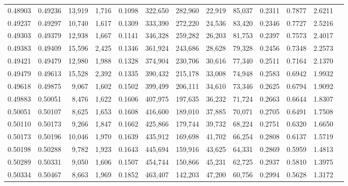 \begin{tabular}{rrrrrrrrrrrrr}
0.48903 & 0.49236 & 13,919 & 1,716 &                                     0.1098 & 322,650 & 282,960 &  22,919 &  85,037 & 0.2311 & 0.7877 & 2.6211 \\
0.49237 & 0.49297 & 10,740 & 1,617 &                                     0.1309 & 333,390 & 272,220 &  24,536 &  83,420 & 0.2346 & 0.7727 & 2.5216 \\
0.49303 & 0.49379 & 12,938 & 1,667 &                                     0.1141 & 346,328 & 259,282 &  26,203 &  81,753 & 0.2397 & 0.7573 & 2.4017 \\
0.49383 & 0.49409 & 15,596 & 2,425 &                                     0.1346 & 361,924 & 243,686 &  28,628 &  79,328 & 0.2456 & 0.7348 & 2.2573 \\
0.49421 & 0.49479 & 12,980 & 1,988 &                                     0.1328 & 374,904 & 230,706 &  30,616 &  77,340 & 0.2511 & 0.7164 & 2.1370 \\
0.49479 & 0.49613 & 15,528 & 2,392 &                                     0.1335 & 390,432 & 215,178 &  33,008 &  74,948 & 0.2583 & 0.6942 & 1.9932 \\
0.49618 & 0.49875 &  9,067 & 1,602 &                                     0.1502 & 399,499 & 206,111 &  34,610 &  73,346 & 0.2625 & 0.6794 & 1.9092 \\
0.49883 & 0.50051 &  8,476 & 1,622 &                                     0.1606 & 407,975 & 197,635 &  36,232 &  71,724 & 0.2663 & 0.6644 & 1.8307 \\
0.50051 & 0.50107 &  8,625 & 1,653 &                                     0.1608 & 416,600 & 189,010 &  37,885 &  70,071 & 0.2705 & 0.6491 & 1.7508 \\
0.50110 & 0.50173 &  9,266 & 1,847 &                                     0.1662 & 425,866 & 179,744 &  39,732 &  68,224 & 0.2751 & 0.6320 & 1.6650 \\
0.50173 & 0.50196 & 10,046 & 1,970 &                                     0.1639 & 435,912 & 169,698 &  41,702 &  66,254 & 0.2808 & 0.6137 & 1.5719 \\
0.50198 & 0.50288 &  9,782 & 1,923 &                                     0.1643 & 445,694 & 159,916 &  43,625 &  64,331 & 0.2869 & 0.5959 & 1.4813 \\
0.50289 & 0.50331 &  9,050 & 1,606 &                                     0.1507 & 454,744 & 150,866 &  45,231 &  62,725 & 0.2937 & 0.5810 & 1.3975 \\
0.50334 & 0.50467 &  8,663 & 1,969 &                                     0.1852 & 463,407 & 142,203 &  47,200 &  60,756 & 0.2994 & 0.5628 & 1.3172 \\

\end{tabular}
